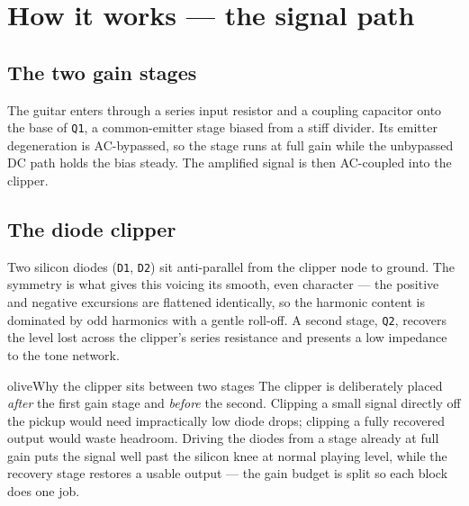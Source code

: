 \documentclass{schemaforge-report}
\begin{document}
\section{How it works --- the signal path}
\subsection{The two gain stages}
The guitar enters through a series input resistor and a coupling capacitor onto the base of
\texttt{Q1}, a common-emitter stage biased from a stiff divider. Its emitter degeneration is
AC-bypassed, so the stage runs at full gain while the unbypassed DC path holds the bias steady. The
amplified signal is then AC-coupled into the clipper.

\subsection{The diode clipper}
Two silicon diodes (\texttt{D1}, \texttt{D2}) sit anti-parallel from the clipper node to ground. The
symmetry is what gives this voicing its smooth, even character --- the positive and negative
excursions are flattened identically, so the harmonic content is dominated by odd harmonics with a
gentle roll-off. A second stage, \texttt{Q2}, recovers the level lost across the clipper's series
resistance and presents a low impedance to the tone network.

\begin{callout}{olive}{Why the clipper sits between two stages}
The clipper is deliberately placed \emph{after} the first gain stage and \emph{before} the second.
Clipping a small signal directly off the pickup would need impractically low diode drops; clipping a
fully recovered output would waste headroom. Driving the diodes from a stage already at full gain
puts the signal well past the silicon knee at normal playing level, while the recovery stage restores
a usable output --- the gain budget is split so each block does one job.
\end{callout}
\end{document}
